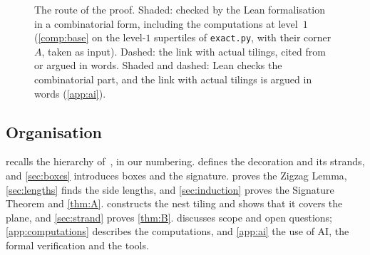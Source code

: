 \documentclass[11pt]{amsart}
\theoremstyle{definition}
\theoremstyle{remark}
\newcommand{\code}[1]{\texttt{#1}}
\begin{document}
\begin{figure}[t]
\caption{The route of the proof. Shaded: checked by the Lean formalisation in a combinatorial form, including the
computations at level~$1$ (\cref{comp:base} on the level-$1$ supertiles of \code{exact.py}, with their corner $A$, taken as input). Dashed: the
link with actual tilings, cited from~\cite{SMKGS-spectre} or argued in words. Shaded and dashed: Lean checks the
combinatorial part, and the link with actual tilings is argued in words (\cref{app:ai}).}
\label{fig:roadmap}
\end{figure}

\subsection*{Organisation}
 recalls the hierarchy of~\cite{SMKGS-spectre}, in our numbering.  defines the
decoration and its strands, and \cref{sec:boxes} introduces boxes and the signature.  proves the
Zigzag Lemma, \cref{sec:lengths} finds the side lengths, and \cref{sec:induction} proves the Signature Theorem and
\cref{thm:A}.  constructs the nest tiling and shows that it covers the plane, and \cref{sec:strand}
proves \cref{thm:B}.  discusses scope and open questions; \cref{app:computations} describes the
computations, and \cref{app:ai} the use of AI, the formal verification and the tools.
\end{document}
